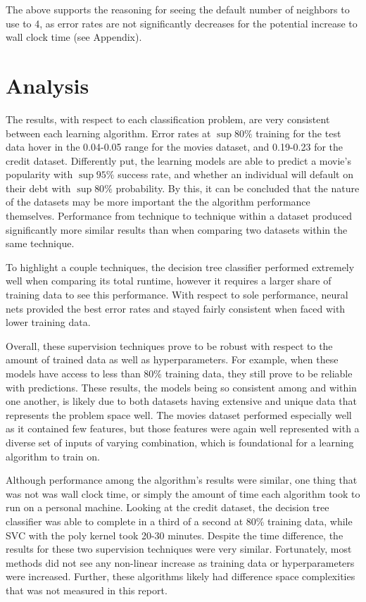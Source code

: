 \documentclass{article}
\begin{document}
The above supports the reasoning for seeing the default number of neighbors to use to 4, as error rates are not significantly decreases for the potential increase to wall clock time (see Appendix).

\pagebreak

\section{Analysis}

The results, with respect to each classification problem, are very consistent between each learning algorithm. Error rates at $\sup80\%$ training for the test data hover in the 0.04-0.05 range for the movies dataset, and 0.19-0.23 for the credit dataset. Differently put, the learning models are able to predict a movie's popularity with $\sup 95\%$ success rate, and whether an individual will default on their debt with $\sup 80\%$ probability. By this, it can be concluded that the nature of the datasets may be more important the the algorithm performance themselves. Performance from technique to technique within a dataset produced significantly more similar results than when comparing two datasets within the same technique.

To highlight a couple techniques, the decision tree classifier performed extremely well when comparing its total runtime, however it requires a larger share of training data to see this performance. With respect to sole performance, neural nets provided the best error rates and stayed fairly consistent when faced with lower training data.

Overall, these supervision techniques prove to be robust with respect to the amount of trained data as well as hyperparameters. For example, when these models have access to less than 80\% training data, they still prove to be reliable with predictions. These results, the models being so consistent among and within one another, is likely due to both datasets having extensive and unique data that represents the problem space well. The movies dataset performed especially well as it contained few features, but those features were again well represented with a diverse set of inputs of varying combination, which is foundational for a learning algorithm to train on.

Although performance among the algorithm's results were similar, one thing that was not was wall clock time, or simply the amount of time each algorithm took to run on a personal machine. Looking at the credit dataset, the decision tree classifier was able to complete in a third of a second at 80\% training data, while SVC with the poly kernel took 20-30 minutes. Despite the time difference, the results for these two supervision techniques were very similar. Fortunately, most methods did not see any non-linear increase as training data or hyperparameters were increased. Further, these algorithms likely had difference space complexities that was not measured in this report.
\end{document}
